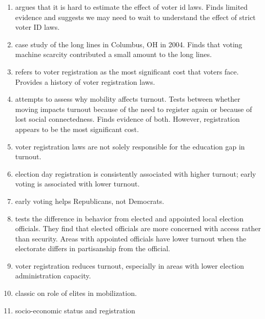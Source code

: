 \documentclass[12pt]{article}
\begin{document}
\begin{enumerate}
\item \citet{highton2017voter} argues that it is hard to estimate the effect of voter id laws. Finds limited evidence and suggests we may need to wait to understand the effect of strict voter ID laws. 

\item \citet{highton2006long} case study of the long lines in Columbus, OH in 2004. Finds that voting machine scarcity contributed a small amount to the long lines. 

\item \citet{highton2004voter} refers to voter registration as the most significant cost that voters face. Provides a history of voter registration laws. 

\item \citet{highton2000residential} attempts to assess why mobility affects turnout. Tests between whether moving impacts turnout because of the need to register again or because of lost social connectedness. Finds evidence of both. However, registration appears to be the most significant cost. 

\item \citet{highton1997easy} voter registration laws are not solely responsible for the education gap in turnout. 

\item \citet{burden2014election} election day registration is consistently associated with higher turnout; early voting is associated with lower turnout. 

\item \citet{burden2017complicated} early voting helps Republicans, not Democrats. 

\item \citet{burden2013selection} tests the difference in behavior from elected and appointed local election officials. They find that elected officials are more concerned with access rather than security. Areas with appointed officials have lower turnout when the electorate differs in partisanship from the official. 

\item \citet{burden2013election} voter registration reduces turnout, especially in areas with lower election administration capacity. 

\item \citet{rosenstone1993mobilization} classic on role of elites in mobilization. 

\item \citet{wolfinger1980votes} socio-economic status and registration


\end{enumerate}
\end{document}
